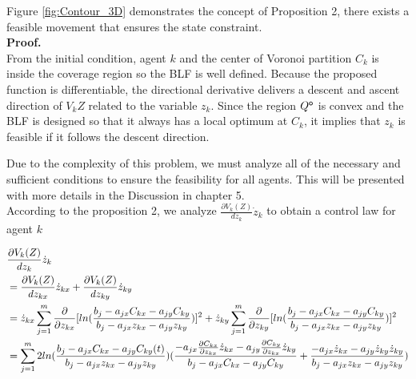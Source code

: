 \noindent Figure \ref{fig:Contour_3D} demonstrates the concept of Proposition 2, there exists a feasible movement that ensures the state constraint. \\

\noindent \textbf{Proof.} \\
From the initial condition, agent $k$ and the center of Voronoi partition $C_k$ is inside the coverage region so the BLF is well defined. Because the proposed function is differentiable, the directional derivative delivers a descent and ascent direction of $V_k{Z}$ related to the variable $z_k$. Since the region $Q^{\mathsf{o}}$ is convex and the BLF is designed so that it always has a local optimum at $C_k$, it implies that $z_k$ is feasible if it follows the descent direction.

\noindent Due to the complexity of this problem, we must analyze all of the necessary and sufficient conditions to ensure the feasibility for all agents. This will be presented with more details in the Discussion in chapter 5. \\

\noindent According to the proposition 2, we analyze $\frac{\partial V_k(Z)}{dz_k}\dot z_k$ to obtain a control law for agent $k$

\begin{equation} \notag
\begin{split}
& \frac{\partial V_k(Z)}{dz_k}\dot z_k \\
& = \frac{\partial V_k(Z)}{dz_{kx}}\dot z_{kx} + \frac{\partial V_k(Z)}{dz_{ky}}\dot z_{ky} \\
& = \dot z_{kx} \displaystyle\sum_{j=1}^{m} \frac{\partial}{\partial z_{kx}} [ln(\frac{b_j - a_{jx}C_{kx} - a_{jy}C_{ky}}{b_j - a_{jx}z_{kx} - a_{jy}z_{ky}})]^2 + \dot z_{ky} \displaystyle\sum_{j=1}^{m} \frac{\partial}{\partial z_{ky}} [ln(\frac{b_j - a_{jx}C_{kx} - a_{jy}C_{ky}}{b_j - a_{jx}z_{kx} - a_{jy}z_{ky}})]^2 \\
%
& = \displaystyle\sum_{j=1}^{m} 2ln(\frac{b_j - a_{jx}C_{kx} - a_{jy}C_{ky}(t)}{b_j - a_{jx}z_{kx} - a_{jy}z_{ky}})(\frac{-a_{jx}\frac{\partial C_{kx}}{\partial z_{kx}}\dot z_{kx} - a_{jy}\frac{\partial C_{ky}}{\partial z_{kx}}\dot z_{ky}}{b_j - a_{jx}C_{kx} - a_{jy}C_{ky}} + \frac{-a_{jx}\dot z_{kx} - a_{jy}\dot z_{ky}\dot z_{ky}}{b_j - a_{jx}z_{kx} - a_{jy}z_{ky}}) \\ 
\end{split}
\end{equation}

